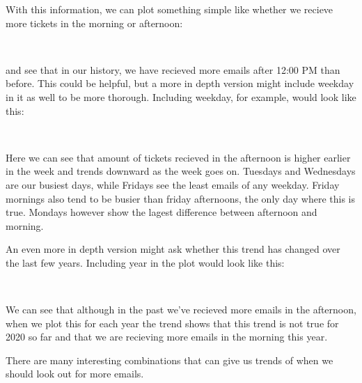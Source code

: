 \documentclass[11pt]{article}
\begin{document}
With this information, we can plot something simple like whether we
recieve more tickets in the morning or afternoon:

    \begin{center}
    \end{center}
    { \hspace*{\fill} \\}
    
    and see that in our history, we have recieved more emails after 12:00 PM
than before. This could be helpful, but a more in depth version might
include weekday in it as well to be more thorough. Including weekday,
for example, would look like this:

    \begin{center}
    \end{center}
    { \hspace*{\fill} \\}
    
    Here we can see that amount of tickets recieved in the afternoon is
higher earlier in the week and trends downward as the week goes on.
Tuesdays and Wednesdays are our busiest days, while Fridays see the
least emails of any weekday. Friday mornings also tend to be busier than
friday afternoons, the only day where this is true. Mondays however show
the lagest difference between afternoon and morning.

    An even more in depth version might ask whether this trend has changed
over the last few years. Including year in the plot would look like
this:


    \begin{center}
    \end{center}
    { \hspace*{\fill} \\}
    
    We can see that although in the past we've recieved more emails in the
afternoon, when we plot this for each year the trend shows that this
trend is not true for 2020 so far and that we are recieving more emails
in the morning this year.

There are many interesting combinations that can give us trends of when
we should look out for more emails.

    \begin{center}
    \end{center}
    { \hspace*{\fill} \\}
    
\end{document}
